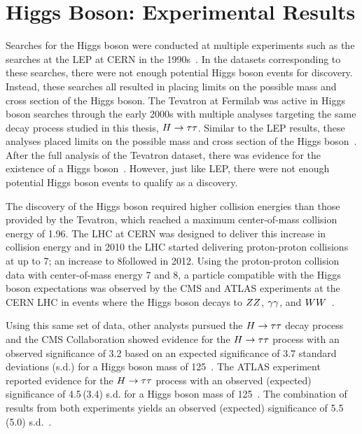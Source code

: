 \section{Higgs Boson: Experimental Results}
Searches for the Higgs boson were conducted at multiple experiments such as the searches
at the LEP at CERN in the 1990s~\cite{Barate:2000ts,Abdallah:2003ip,Achard:2001pj,Abbiendi:2000ac}.
In the datasets corresponding to these searches, there were not enough potential Higgs
boson events for discovery.
Instead, these searches all resulted in placing limits on the possible mass and cross section
of the Higgs boson. The Tevatron at Fermilab was active in Higgs boson searches through the early 2000s
with multiple analyses targeting the same decay process studied in this thesis, $H\to\tau\tau$. 
Similar to the LEP results, these analyses
placed limits on the possible mass and cross section of the Higgs boson~\cite{Aaltonen:2012jh, Abazov:2012zj}.
After the full analysis of the Tevatron dataset, there was evidence for the existence of a Higgs 
boson~\cite{PhysRevD.88.052014, PhysRevLett.109.071804}. However,
just like LEP, there were not enough potential Higgs boson events to qualify as a discovery.

The discovery of the Higgs boson required higher collision energies than those provided
by the Tevatron, which reached a maximum center-of-mass collision energy of 1.96\TeV. The
LHC at CERN was designed to deliver this increase in collision energy and in 2010 the LHC started
delivering proton-proton collisions at up to 7\TeV; an increase to 8\TeV followed in 2012.
Using the proton-proton collision data with center-of-mass energy 7 and 8\TeV,
a particle compatible with the Higgs boson expectations was observed by the CMS and ATLAS experiments at the CERN LHC
in events where the Higgs boson decays to $ZZ$, $\gamma\gamma$, and 
$WW$~\cite{Aad:2012tfa, Chatrchyan:2012xdj, Chatrchyan:2013lba}.

Using this same set of data, other analysts pursued the $H\to\tau\tau$ decay process and
the CMS Collaboration showed evidence for the $H\to\tau\tau$ process with an observed
significance of 3.2 based on an expected significance of 3.7 standard deviations (s.d.)
for a Higgs boson mass of 125\GeV~\cite{Chatrchyan:2014nva}.
The ATLAS experiment reported evidence for the $H\to\tau\tau$ process 
with an observed (expected) significance of 4.5\,(3.4)
s.d. for a Higgs boson mass of 125\GeV~\cite{Aad:2015vsa}.
The combination of results from both experiments yields an observed (expected)
significance of 5.5\,(5.0) s.d.~\cite{Khachatryan:2016vau}.

